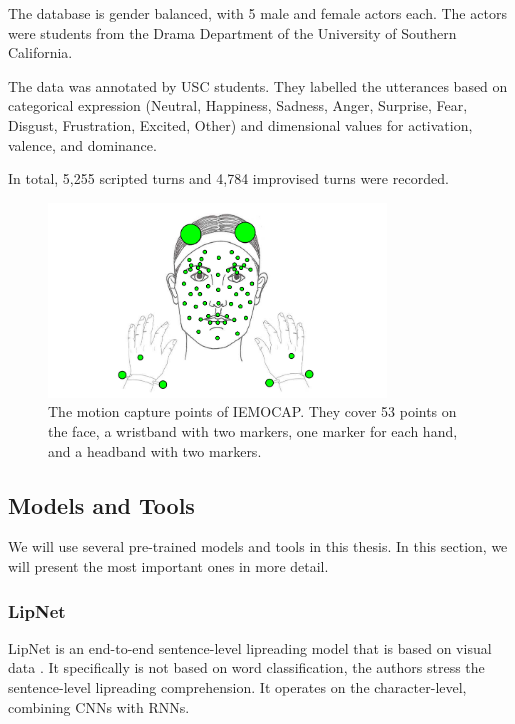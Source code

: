 The database is gender balanced, with 5 male and female actors each. The actors were students from the Drama Department of the University of Southern California.

The data was annotated by USC students. They labelled the utterances based on categorical expression (Neutral, Happiness, Sadness, Anger, Surprise, Fear, Disgust, Frustration, Excited, Other) and dimensional values for activation, valence, and dominance.

In total, 5,255 scripted turns and 4,784 improvised turns were recorded. 

\begin{figure}
    \centering
    \includegraphics[width=0.8\textwidth]{res/iemocap.png}
    \caption{The motion capture points of IEMOCAP. They cover 53 points on the face, a wristband with two markers, one marker for each hand, and a headband with two markers. \cite{busso2008iemocap}}
    \label{fig:iemocap_cap}
\end{figure}

\subsection{Models and Tools}

We will use several pre-trained models and tools in this thesis. In this section, we will present the most important ones in more detail.

\subsubsection{LipNet}

LipNet is an end-to-end sentence-level lipreading model that is based on visual data \cite{assael2016lipnet}. It specifically is not based on word classification, the authors stress the sentence-level lipreading comprehension. It operates on the character-level, combining CNNs with RNNs.

